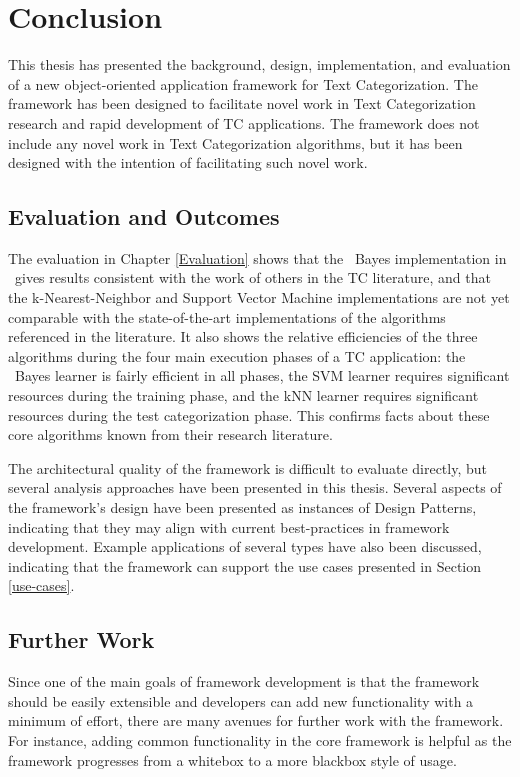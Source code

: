 \chapter{Conclusion}
\label{Conclusion}

This thesis has presented the background, design, implementation, and
evaluation of a new object-oriented application framework for Text
Categorization.  The framework has been designed to facilitate novel
work in Text Categorization research and rapid development of TC
applications.
The framework does not include any novel work in Text
Categorization algorithms, but it has been designed with the intention
of facilitating such novel work.

\section{Evaluation and Outcomes}

The evaluation in Chapter \ref{Evaluation} shows that the \naive\
Bayes implementation in \aicat\ gives results consistent with the work of others
in the TC literature, and that the k-Nearest-Neighbor and
Support Vector Machine implementations are not yet comparable with the
state-of-the-art implementations of the algorithms referenced in the
literature.  It also shows the relative efficiencies of the three
algorithms during the four main execution phases of a TC application:
the \naive\ Bayes learner is fairly efficient in all phases, the SVM
learner requires significant resources during the training phase, and
the kNN learner requires significant resources during the test
categorization phase.  This confirms facts about these core algorithms
known from their research literature.

The architectural quality of the framework is difficult to evaluate
directly, but several analysis approaches have been presented in this
thesis.  Several \linebreak aspects of the framework's design have been presented
as instances of Design Patterns, indicating that they may align with
current best-practices in framework development.  Example applications
of several types have also been discussed, indicating that the
framework can support the use cases presented in Section
\ref{use-cases}.

\section{Further Work}

Since one of the main goals of framework development is that the
framework should be easily extensible and developers can add new
functionality with a minimum of effort, there are many avenues for
further work with the framework.  For instance, adding common
functionality in the core framework is helpful as the framework
progresses from a whitebox to a more blackbox style of usage.

